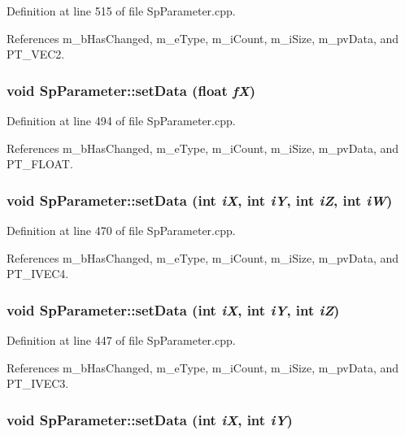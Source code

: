 Definition at line 515 of file Sp\-Parameter.cpp.

References m\_\-b\-Has\-Changed, m\_\-e\-Type, m\_\-i\-Count, m\_\-i\-Size, m\_\-pv\-Data, and PT\_\-VEC2.
\subsubsection{\setlength{\rightskip}{0pt plus 5cm}void Sp\-Parameter::set\-Data (float {\em f\-X})}\label{classSpark_1_1SpParameter_a29}


Definition at line 494 of file Sp\-Parameter.cpp.

References m\_\-b\-Has\-Changed, m\_\-e\-Type, m\_\-i\-Count, m\_\-i\-Size, m\_\-pv\-Data, and PT\_\-FLOAT.
\subsubsection{\setlength{\rightskip}{0pt plus 5cm}void Sp\-Parameter::set\-Data (int {\em i\-X}, int {\em i\-Y}, int {\em i\-Z}, int {\em i\-W})}\label{classSpark_1_1SpParameter_a28}


Definition at line 470 of file Sp\-Parameter.cpp.

References m\_\-b\-Has\-Changed, m\_\-e\-Type, m\_\-i\-Count, m\_\-i\-Size, m\_\-pv\-Data, and PT\_\-IVEC4.
\subsubsection{\setlength{\rightskip}{0pt plus 5cm}void Sp\-Parameter::set\-Data (int {\em i\-X}, int {\em i\-Y}, int {\em i\-Z})}\label{classSpark_1_1SpParameter_a27}


Definition at line 447 of file Sp\-Parameter.cpp.

References m\_\-b\-Has\-Changed, m\_\-e\-Type, m\_\-i\-Count, m\_\-i\-Size, m\_\-pv\-Data, and PT\_\-IVEC3.
\subsubsection{\setlength{\rightskip}{0pt plus 5cm}void Sp\-Parameter::set\-Data (int {\em i\-X}, int {\em i\-Y})}\label{classSpark_1_1SpParameter_a26}


